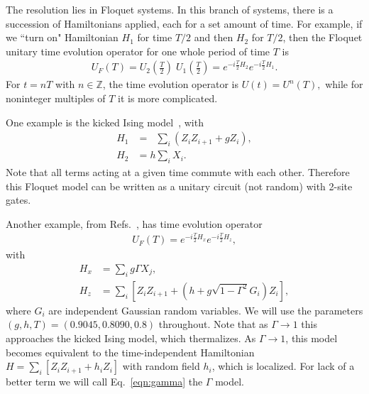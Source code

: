 \documentclass[a4paper,12pt]{article}
\newcommand{\nn}{\nonumber\\}
\begin{document}
The resolution lies in Floquet systems. In this branch of systems, there is a succession of Hamiltonians applied, each for a set amount of time. For example, if we ``turn on" Hamiltonian $H_1$ for time $T/2$ and then $H_2$ for $T/2$, then the Floquet unitary time evolution operator for one whole period of time $T$ is 
\begin{align}
U_F(T) = U_2\left(\frac{T}{2}\right)\; U_1\left(\frac{T}{2}\right) = e^{-i\frac{T}{2}H_2} e^{-i\frac{T}{2}H_1}.
\end{align}
For $t=nT$ with $n\in \mathbb{Z}$, the time evolution operator is $U(t)=U^n(T),$ while for noninteger multiples of $T$ it is more complicated. 

One example is the kicked Ising model~\cite{vonKeyserlingkHydro}, with 
\begin{align}
H_1 &= \phantom{h}\sum_i\left(Z_iZ_{i+1}+gZ_i\right),\nn
H_2 &= h\sum_iX_i. \label{eqn:kicked}
\end{align}
Note that all terms acting at a given time commute with each other. Therefore this Floquet model can be written as a unitary circuit (not random) with 2-site gates. 

Another example, from Refs.~\cite{ZhangFloq, ChenOtoc}, has time evolution operator 
\begin{align}
U_F(T) = e^{-i\frac{T}{2}H_x}e^{-i\frac{T}{2}H_z}, \label{eqn:gamma}
\end{align}
with
\begin{align}
H_x &= \sum_i g\Gamma X_j,\nn
H_z &= \sum_i \left[Z_iZ_{i+1} + (h+g\sqrt{1-\Gamma^2}G_i)Z_i\right],
\end{align}
where $G_i$ are independent Gaussian random variables. We will use the parameters $(g,h,T) = (0.9045,0.8090,0.8)$ throughout.
Note that as $\Gamma\to1$ this approaches the kicked Ising model, which thermalizes. As $\Gamma\to1$, this model becomes equivalent to the time-independent Hamiltonian $H=\sum_i\left[Z_iZ_{i+1} + h_iZ_i\right]$ with random field $h_i$, which is localized. For lack of a better term we will call Eq.~\ref{eqn:gamma} the $\Gamma$ model.
\end{document}
